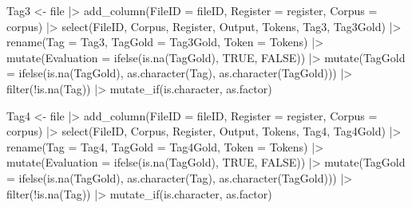 \documentclass[
  letterpaper,
  DIV=11,
  numbers=noendperiod]{scrreprt}
\newenvironment{Shaded}{\begin{snugshade}}{\end{snugshade}}
\newcommand{\AttributeTok}[1]{\textcolor[rgb]{0.40,0.45,0.13}{#1}}
\newcommand{\ConstantTok}[1]{\textcolor[rgb]{0.56,0.35,0.01}{#1}}
\newcommand{\FunctionTok}[1]{\textcolor[rgb]{0.28,0.35,0.67}{#1}}
\newcommand{\NormalTok}[1]{\textcolor[rgb]{0.00,0.23,0.31}{#1}}
\newcommand{\OtherTok}[1]{\textcolor[rgb]{0.00,0.23,0.31}{#1}}
\newcommand{\SpecialCharTok}[1]{\textcolor[rgb]{0.37,0.37,0.37}{#1}}
\begin{document}
\begin{Shaded}
\begin{Highlighting}[]
\NormalTok{Tag3 }\OtherTok{\textless{}{-}}\NormalTok{ file }\SpecialCharTok{|\textgreater{}} 
  \FunctionTok{add\_column}\NormalTok{(}\AttributeTok{FileID =}\NormalTok{ fileID, }\AttributeTok{Register =}\NormalTok{ register, }\AttributeTok{Corpus =}\NormalTok{ corpus) }\SpecialCharTok{|\textgreater{}}
  \FunctionTok{select}\NormalTok{(FileID, Corpus, Register, Output, Tokens, Tag3, Tag3Gold) }\SpecialCharTok{|\textgreater{}} 
  \FunctionTok{rename}\NormalTok{(}\AttributeTok{Tag =}\NormalTok{ Tag3, }\AttributeTok{TagGold =}\NormalTok{ Tag3Gold, }\AttributeTok{Token =}\NormalTok{ Tokens) }\SpecialCharTok{|\textgreater{}} 
  \FunctionTok{mutate}\NormalTok{(}\AttributeTok{Evaluation =} \FunctionTok{ifelse}\NormalTok{(}\FunctionTok{is.na}\NormalTok{(TagGold), }\ConstantTok{TRUE}\NormalTok{, }\ConstantTok{FALSE}\NormalTok{)) }\SpecialCharTok{|\textgreater{}} 
  \FunctionTok{mutate}\NormalTok{(}\AttributeTok{TagGold =} \FunctionTok{ifelse}\NormalTok{(}\FunctionTok{is.na}\NormalTok{(TagGold), }\FunctionTok{as.character}\NormalTok{(Tag), }\FunctionTok{as.character}\NormalTok{(TagGold))) }\SpecialCharTok{|\textgreater{}}
  \FunctionTok{filter}\NormalTok{(}\SpecialCharTok{!}\FunctionTok{is.na}\NormalTok{(Tag)) }\SpecialCharTok{|\textgreater{}} 
  \FunctionTok{mutate\_if}\NormalTok{(is.character, as.factor)}

\NormalTok{Tag4 }\OtherTok{\textless{}{-}}\NormalTok{ file }\SpecialCharTok{|\textgreater{}} 
  \FunctionTok{add\_column}\NormalTok{(}\AttributeTok{FileID =}\NormalTok{ fileID, }\AttributeTok{Register =}\NormalTok{ register, }\AttributeTok{Corpus =}\NormalTok{ corpus) }\SpecialCharTok{|\textgreater{}}
  \FunctionTok{select}\NormalTok{(FileID, Corpus, Register, Output, Tokens, Tag4, Tag4Gold) }\SpecialCharTok{|\textgreater{}} 
  \FunctionTok{rename}\NormalTok{(}\AttributeTok{Tag =}\NormalTok{ Tag4, }\AttributeTok{TagGold =}\NormalTok{ Tag4Gold, }\AttributeTok{Token =}\NormalTok{ Tokens) }\SpecialCharTok{|\textgreater{}} 
  \FunctionTok{mutate}\NormalTok{(}\AttributeTok{Evaluation =} \FunctionTok{ifelse}\NormalTok{(}\FunctionTok{is.na}\NormalTok{(TagGold), }\ConstantTok{TRUE}\NormalTok{, }\ConstantTok{FALSE}\NormalTok{)) }\SpecialCharTok{|\textgreater{}} 
  \FunctionTok{mutate}\NormalTok{(}\AttributeTok{TagGold =} \FunctionTok{ifelse}\NormalTok{(}\FunctionTok{is.na}\NormalTok{(TagGold), }\FunctionTok{as.character}\NormalTok{(Tag), }\FunctionTok{as.character}\NormalTok{(TagGold))) }\SpecialCharTok{|\textgreater{}}
  \FunctionTok{filter}\NormalTok{(}\SpecialCharTok{!}\FunctionTok{is.na}\NormalTok{(Tag)) }\SpecialCharTok{|\textgreater{}} 
  \FunctionTok{mutate\_if}\NormalTok{(is.character, as.factor)}


\end{Highlighting}
\end{Shaded}
\end{document}
